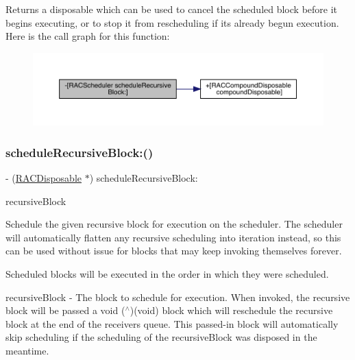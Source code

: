 Returns a disposable which can be used to cancel the scheduled block before it begins executing, or to stop it from rescheduling if it\textquotesingle{}s already begun execution. Here is the call graph for this function\+:\nopagebreak
\begin{figure}[H]
\begin{center}
\leavevmode
\includegraphics[width=350pt]{interface_r_a_c_scheduler_aff5ee7293a775dc51a4ae35fb91ab13b_cgraph}
\end{center}
\end{figure}
\mbox{\label{interface_r_a_c_scheduler_aff5ee7293a775dc51a4ae35fb91ab13b}} 
\subsubsection{\texorpdfstring{schedule\+Recursive\+Block\+:()}{scheduleRecursiveBlock:()}\hspace{0.1cm}{\footnotesize\ttfamily [3/3]}}
{\footnotesize\ttfamily -\/ (\mbox{\hyperlink{interface_r_a_c_disposable}{R\+A\+C\+Disposable}} $\ast$) schedule\+Recursive\+Block\+: \begin{DoxyParamCaption}\item[{(R\+A\+C\+Scheduler\+Recursive\+Block)}]{recursive\+Block }\end{DoxyParamCaption}}

Schedule the given recursive block for execution on the scheduler. The scheduler will automatically flatten any recursive scheduling into iteration instead, so this can be used without issue for blocks that may keep invoking themselves forever.

Scheduled blocks will be executed in the order in which they were scheduled.

recursive\+Block -\/ The block to schedule for execution. When invoked, the recursive block will be passed a {\ttfamily void ($^\wedge$)(void)} block which will reschedule the recursive block at the end of the receiver\textquotesingle{}s queue. This passed-\/in block will automatically skip scheduling if the scheduling of the {\ttfamily recursive\+Block} was disposed in the meantime.

